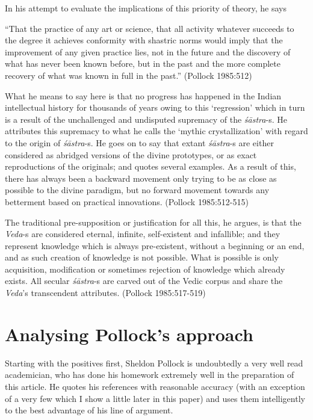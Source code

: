 In his attempt to evaluate the implications of this priority of theory, he says
\begin{myquote}
``That the practice of any art or science, that all activity whatever succeeds to the degree it achieves conformity with shastric norms would imply that the improvement of any given practice lies, not in the future and the discovery of what has never been known before, but in the past and the more complete recovery of what was known in full in the past.'' (Pollock 1985:512)
\end{myquote}

What he means to say here is that no progress has happened in the Indian intellectual history for thousands of years owing to this `regression' which in turn is a result of the unchallenged and undisputed supremacy of the {\it śāstra}-s. He attributes this supremacy to what he calls the `mythic crystallization' with regard to the origin of {\it śāstra}-s. He goes on to say that extant {\it śāstra}-s are either considered as abridged versions of the divine prototypes, or as exact reproductions of the originals; and quotes several examples. As a result of this, there has always been a backward movement only trying to be as close as possible to the divine paradigm, but no forward movement towards any betterment based on practical innovations. (Pollock 1985:512-515)

The traditional pre-supposition or justification for all this, he argues, is that the {\it Veda}-s are considered eternal, infinite, self-existent and infallible; and they represent knowledge which is always pre-existent, without a beginning or an end, and as such creation of knowledge is not possible. What is possible is only acquisition, modification or sometimes rejection of knowledge which already exists. All secular {\it śāstra}-s are carved out of the Vedic corpus and share the {\it Veda}'s transcendent attributes. (Pollock 1985:517-519)

\section*{Analysing Pollock's approach}

Starting with the positives first, Sheldon Pollock is undoubtedly a very well read academician, who has done his homework extremely well in the preparation of this article. He quotes his references with reasonable accuracy (with an exception of a very few which I show a little later in this paper) and uses them intelligently to the best advantage of his line of argument. 

